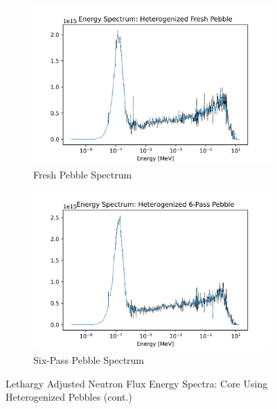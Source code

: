 \begin{figure}[H]\ContinuedFloat
\centering

\begin{subfigure}{0.95\textwidth}
  \includegraphics[width=0.95\linewidth]{figures/fresh_spec_het}
  \caption{Fresh Pebble Spectrum}
  \label{fig:het-fresh}
\end{subfigure}%


\begin{subfigure}{0.95\textwidth}
  \includegraphics[width=0.95\linewidth]{figures/6_spec_het}
  \caption{Six-Pass Pebble Spectrum}
  \label{fig:het-six}
\end{subfigure}%

\caption{Lethargy Adjusted Neutron Flux Energy Spectra: Core Using Heterogenized Pebbles (cont.)}
\end{figure}

